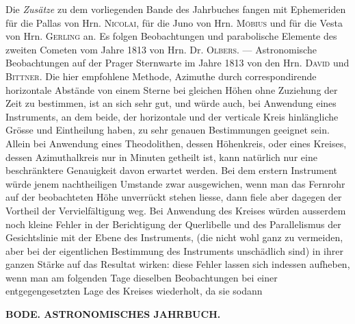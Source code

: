 Die \emph{Zusätze} zu dem vorliegenden Bande des Jahrbuches fangen mit Ephemeriden für die Pallas
von Hrn. \textsc{Nicolai}, für die Juno von Hrn. \textsc{Möbius} und für die Vesta von Hrn.
\textsc{Gerling} an. Es folgen Beobachtungen und parabolische Elemente des zweiten Cometen vom
Jahre 1813 von Hrn. Dr. \textsc{Olbers}. --- Astronomische Beobachtungen auf der Prager Sternwarte
im Jahre 1813 von den Hrn. \textsc{David} und \textsc{Bittner}. Die hier empfohlene Methode,
Azimuthe durch correspondirende horizontale Abstände von einem Sterne bei gleichen Höhen ohne
Zuziehung der Zeit zu bestimmen, ist an sich sehr gut, und würde auch, bei Anwendung eines
Instruments, an dem beide, der horizontale und der verticale Kreis hinlängliche Grösse und
Eintheilung haben, zu sehr genauen Bestimmungen geeignet sein. Allein bei Anwendung eines
Theodolithen, dessen Höhenkreis, oder eines Kreises, dessen Azimuthalkreis nur in Minuten
getheilt ist, kann natürlich nur eine beschränktere Genauigkeit davon erwartet werden. Bei dem
erstern Instrument würde jenem nachtheiligen Umstande zwar ausgewichen, wenn man das Fernrohr auf
der beobachteten Höhe unverrückt stehen liesse, dann fiele aber dagegen der Vortheil der
Vervielfältigung weg. Bei Anwendung des Kreises würden ausserdem noch kleine Fehler in der
Berichtigung der Querlibelle und des Parallelismus der Gesichtslinie mit der Ebene des
Instruments, (die nicht wohl ganz zu vermeiden, aber bei der eigentlichen Bestimmung des Instruments
unschädlich sind) in ihrer ganzen Stärke auf das Resultat wirken: diese Fehler lassen sich
indessen aufheben, wenn man am folgenden Tage dieselben Beobachtungen bei einer entgegengesetzten
Lage des Kreises wiederholt, da sie sodann
\par\clearpage
\endgroup
\par
\clearpage
\begingroup\pagestyle{empty}
\thispagestyle{empty}
\noindent{}%
\makebox[12mm][l]{}%
\parbox[t]{\dimexpr\linewidth-24mm\relax}{\centering\footnotesize\bfseries BODE. ASTRONOMISCHES JAHRBUCH.}%
\par\nobreak\medskip
